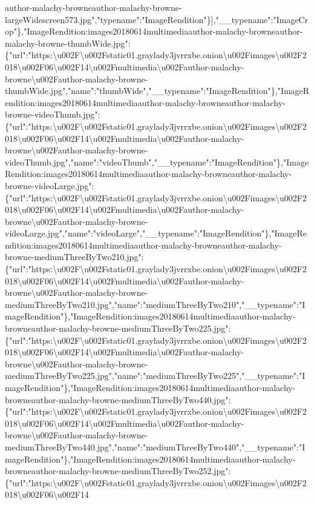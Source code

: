 author-malachy-browneauthor-malachy-browne-largeWidescreen573.jpg","typename":"ImageRendition"\}{]},"\_\_typename":"ImageCrop"\},"ImageRendition:images20180614multimediaauthor-malachy-browneauthor-malachy-browne-thumbWide.jpg":\{"url":"https:\textbackslash{}u002F\textbackslash{}u002Fstatic01.graylady3jvrrxbe.onion\textbackslash{}u002Fimages\textbackslash{}u002F2018\textbackslash{}u002F06\textbackslash{}u002F14\textbackslash{}u002Fmultimedia\textbackslash{}u002Fauthor-malachy-browne\textbackslash{}u002Fauthor-malachy-browne-thumbWide.jpg","name":"thumbWide","\_\_typename":"ImageRendition"\},"ImageRendition:images20180614multimediaauthor-malachy-browneauthor-malachy-browne-videoThumb.jpg":\{"url":"https:\textbackslash{}u002F\textbackslash{}u002Fstatic01.graylady3jvrrxbe.onion\textbackslash{}u002Fimages\textbackslash{}u002F2018\textbackslash{}u002F06\textbackslash{}u002F14\textbackslash{}u002Fmultimedia\textbackslash{}u002Fauthor-malachy-browne\textbackslash{}u002Fauthor-malachy-browne-videoThumb.jpg","name":"videoThumb","\_\_typename":"ImageRendition"\},"ImageRendition:images20180614multimediaauthor-malachy-browneauthor-malachy-browne-videoLarge.jpg":\{"url":"https:\textbackslash{}u002F\textbackslash{}u002Fstatic01.graylady3jvrrxbe.onion\textbackslash{}u002Fimages\textbackslash{}u002F2018\textbackslash{}u002F06\textbackslash{}u002F14\textbackslash{}u002Fmultimedia\textbackslash{}u002Fauthor-malachy-browne\textbackslash{}u002Fauthor-malachy-browne-videoLarge.jpg","name":"videoLarge","\_\_typename":"ImageRendition"\},"ImageRendition:images20180614multimediaauthor-malachy-browneauthor-malachy-browne-mediumThreeByTwo210.jpg":\{"url":"https:\textbackslash{}u002F\textbackslash{}u002Fstatic01.graylady3jvrrxbe.onion\textbackslash{}u002Fimages\textbackslash{}u002F2018\textbackslash{}u002F06\textbackslash{}u002F14\textbackslash{}u002Fmultimedia\textbackslash{}u002Fauthor-malachy-browne\textbackslash{}u002Fauthor-malachy-browne-mediumThreeByTwo210.jpg","name":"mediumThreeByTwo210","\_\_typename":"ImageRendition"\},"ImageRendition:images20180614multimediaauthor-malachy-browneauthor-malachy-browne-mediumThreeByTwo225.jpg":\{"url":"https:\textbackslash{}u002F\textbackslash{}u002Fstatic01.graylady3jvrrxbe.onion\textbackslash{}u002Fimages\textbackslash{}u002F2018\textbackslash{}u002F06\textbackslash{}u002F14\textbackslash{}u002Fmultimedia\textbackslash{}u002Fauthor-malachy-browne\textbackslash{}u002Fauthor-malachy-browne-mediumThreeByTwo225.jpg","name":"mediumThreeByTwo225","\_\_typename":"ImageRendition"\},"ImageRendition:images20180614multimediaauthor-malachy-browneauthor-malachy-browne-mediumThreeByTwo440.jpg":\{"url":"https:\textbackslash{}u002F\textbackslash{}u002Fstatic01.graylady3jvrrxbe.onion\textbackslash{}u002Fimages\textbackslash{}u002F2018\textbackslash{}u002F06\textbackslash{}u002F14\textbackslash{}u002Fmultimedia\textbackslash{}u002Fauthor-malachy-browne\textbackslash{}u002Fauthor-malachy-browne-mediumThreeByTwo440.jpg","name":"mediumThreeByTwo440","\_\_typename":"ImageRendition"\},"ImageRendition:images20180614multimediaauthor-malachy-browneauthor-malachy-browne-mediumThreeByTwo252.jpg":\{"url":"https:\textbackslash{}u002F\textbackslash{}u002Fstatic01.graylady3jvrrxbe.onion\textbackslash{}u002Fimages\textbackslash{}u002F2018\textbackslash{}u002F06\textbackslash{}u002F14\textback
